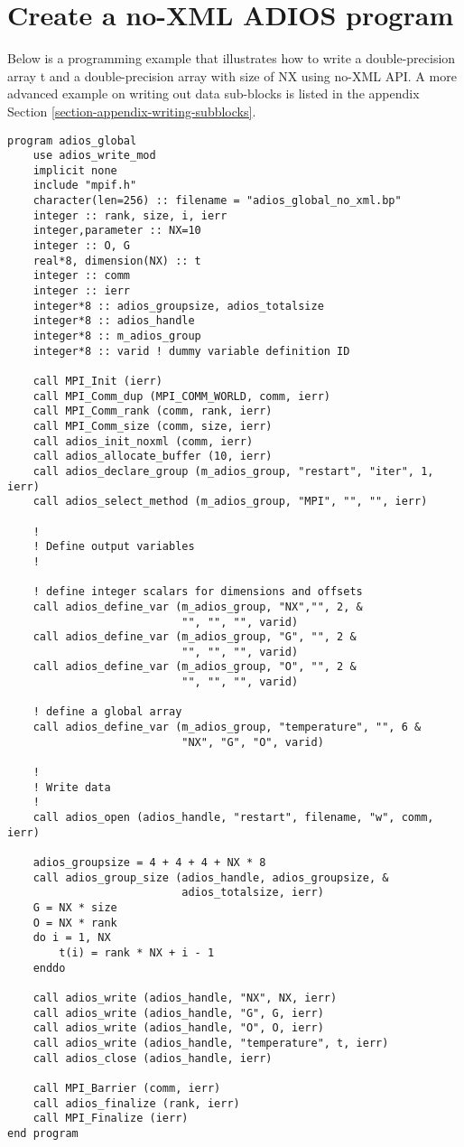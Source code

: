 \section{Create a no-XML ADIOS program}

Below is a programming example that illustrates how to write a double-precision 
array t and a double-precision array with size of NX using no-XML API.
A more advanced example on writing out data sub-blocks is listed in the 
appendix Section \ref{section-appendix-writing-subblocks}. 

\begin{lstlisting}[alsolanguage=Fortran,caption={ADIOS no-XML example},label={}]
program adios_global 
    use adios_write_mod
    implicit none
    include "mpif.h"
    character(len=256) :: filename = "adios_global_no_xml.bp" 
    integer :: rank, size, i, ierr
    integer,parameter :: NX=10
    integer :: O, G    
    real*8, dimension(NX) :: t 
    integer :: comm
    integer :: ierr
    integer*8 :: adios_groupsize, adios_totalsize
    integer*8 :: adios_handle
    integer*8 :: m_adios_group
    integer*8 :: varid ! dummy variable definition ID

    call MPI_Init (ierr)
    call MPI_Comm_dup (MPI_COMM_WORLD, comm, ierr)
    call MPI_Comm_rank (comm, rank, ierr) 
    call MPI_Comm_size (comm, size, ierr)
    call adios_init_noxml (comm, ierr)
    call adios_allocate_buffer (10, ierr)
    call adios_declare_group (m_adios_group, "restart", "iter", 1, ierr) 
    call adios_select_method (m_adios_group, "MPI", "", "", ierr)
    
    !
    ! Define output variables
    !

    ! define integer scalars for dimensions and offsets
    call adios_define_var (m_adios_group, "NX","", 2, &
                           "", "", "", varid) 
    call adios_define_var (m_adios_group, "G", "", 2 &
                           "", "", "", varid) 
    call adios_define_var (m_adios_group, "O", "", 2 &
                           "", "", "", varid)
        
    ! define a global array
    call adios_define_var (m_adios_group, "temperature", "", 6 &
                           "NX", "G", "O", varid)

    !
    ! Write data 
    !
    call adios_open (adios_handle, "restart", filename, "w", comm, ierr)
    
    adios_groupsize = 4 + 4 + 4 + NX * 8
    call adios_group_size (adios_handle, adios_groupsize, &
                           adios_totalsize, ierr)
    G = NX * size 
    O = NX * rank 
    do i = 1, NX
        t(i) = rank * NX + i - 1 
    enddo
    
    call adios_write (adios_handle, "NX", NX, ierr)
    call adios_write (adios_handle, "G", G, ierr)
    call adios_write (adios_handle, "O", O, ierr)
    call adios_write (adios_handle, "temperature", t, ierr)
    call adios_close (adios_handle, ierr) 

    call MPI_Barrier (comm, ierr)
    call adios_finalize (rank, ierr)
    call MPI_Finalize (ierr) 
end program
\end{lstlisting}


